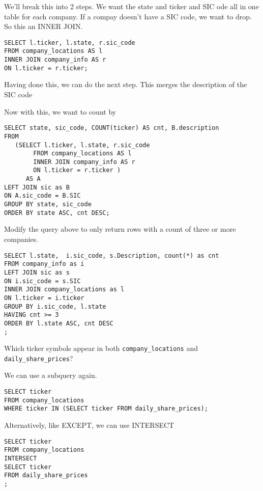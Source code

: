 \documentclass[10pt]{exam}
\begin{document}
\begin{questions}
\begin{solution}
We'll break this into 2 steps.
We want the state and ticker and SIC ode all in one table
for each company. If a compay doesn't have a SIC code, we want to drop.
So this an INNER JOIN.
\begin{lstlisting}
SELECT l.ticker, l.state, r.sic_code
FROM company_locations AS l
INNER JOIN company_info AS r
ON l.ticker = r.ticker;
\end{lstlisting}

Having done this, we can do the next step.
This merges the description of the SIC code 

Now with this, we want to count by


\begin{lstlisting}
SELECT state, sic_code, COUNT(ticker) AS cnt, B.description
FROM 
   (SELECT l.ticker, l.state, r.sic_code
        FROM company_locations AS l
        INNER JOIN company_info AS r
        ON l.ticker = r.ticker )
      AS A
LEFT JOIN sic as B
ON A.sic_code = B.SIC
GROUP BY state, sic_code
ORDER BY state ASC, cnt DESC;
\end{lstlisting}



\end{solution}


\question Modify the query above to only return rows with a count
of three or more companies.

\begin{solution}
\begin{lstlisting}
SELECT l.state,  i.sic_code, s.Description, count(*) as cnt
FROM company_info as i
LEFT JOIN sic as s
ON i.sic_code = s.SIC
INNER JOIN company_locations as l
ON l.ticker = i.ticker
GROUP BY i.sic_code, l.state
HAVING cnt >= 3
ORDER BY l.state ASC, cnt DESC
;
\end{lstlisting}
\end{solution}



    \question Which ticker symbols appear in both
    \texttt{company\_locations} and \texttt{daily\_share\_prices}?

\begin{solution}
 We can use a subquery again.
\begin{lstlisting}
SELECT ticker
FROM company_locations
WHERE ticker IN (SELECT ticker FROM daily_share_prices);
\end{lstlisting}

Alternatively, like EXCEPT, we can use INTERSECT
\begin{lstlisting}
SELECT ticker
FROM company_locations
INTERSECT
SELECT ticker
FROM daily_share_prices
;
\end{lstlisting}
\end{solution}


\end{questions}
\end{document}
